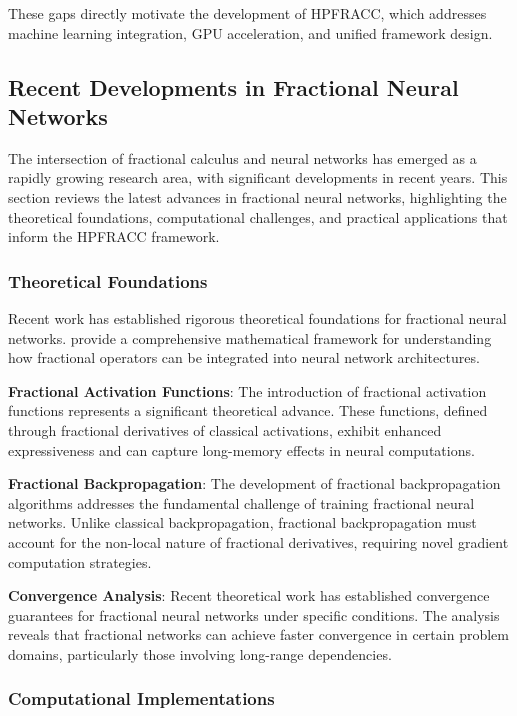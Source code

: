 These gaps directly motivate the development of HPFRACC, which addresses machine learning integration, GPU acceleration, and unified framework design.

\subsection{Recent Developments in Fractional Neural Networks}

The intersection of fractional calculus and neural networks has emerged as a rapidly growing research area, with significant developments in recent years. This section reviews the latest advances in fractional neural networks, highlighting the theoretical foundations, computational challenges, and practical applications that inform the HPFRACC framework.

\subsubsection{Theoretical Foundations}

Recent work has established rigorous theoretical foundations for fractional neural networks. \citet{Chen2023FractionalNeuralNetworks} provide a comprehensive mathematical framework for understanding how fractional operators can be integrated into neural network architectures.

\textbf{Fractional Activation Functions}: The introduction of fractional activation functions represents a significant theoretical advance. These functions, defined through fractional derivatives of classical activations, exhibit enhanced expressiveness and can capture long-memory effects in neural computations.

\textbf{Fractional Backpropagation}: The development of fractional backpropagation algorithms addresses the fundamental challenge of training fractional neural networks. Unlike classical backpropagation, fractional backpropagation must account for the non-local nature of fractional derivatives, requiring novel gradient computation strategies.

\textbf{Convergence Analysis}: Recent theoretical work has established convergence guarantees for fractional neural networks under specific conditions. The analysis reveals that fractional networks can achieve faster convergence in certain problem domains, particularly those involving long-range dependencies.

\subsubsection{Computational Implementations}

